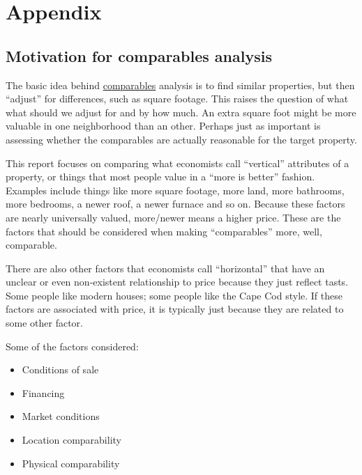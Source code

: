 \documentclass[
12pt, %
letterpaper, %
oneside, %
headinclude,footinclude, %
BCOR5mm, %
]{scrartcl}
\begin{document}
\renewcommand{\refname}{\spacedlowsmallcaps{References}} %


\pagebreak

\appendix

\section{Appendix} 

\subsection{Motivation for comparables analysis} \label{sec:methods}
The basic idea behind \href{https://en.wikipedia.org/wiki/Comparables}{comparables} analysis is to find similar properties, but then ``adjust'' for differences, such as square footage.
This raises the question of what what should we adjust for and by how much.
An extra square foot might be more valuable in one neighborhood than an other. 
Perhaps just as important is assessing whether the comparables are actually reasonable for the target property. 

This report focuses on comparing what economists call ``vertical'' attributes of a property, or things that most people value in a ``more is better'' fashion.
Examples include things like more square footage, more land, more bathrooms, more bedrooms, a newer roof, a newer furnace and so on.
Because these factors are nearly universally valued, more/newer means a higher price.
These are the factors that should be considered when making ``comparables'' more, well, comparable. 

There are also other factors that economists call ``horizontal'' that have an unclear or even non-existent relationship to price because they just reflect tasts.  
Some people like modern houses; some people like the Cape Cod style.
If these factors are associated with price, it is typically just because they are related to some other factor.

Some of the factors considered: 
\begin{itemize}
\item Conditions of sale
\item Financing
\item Market conditions
\item Location comparability
\item Physical comparability 
\end{itemize}
\end{document}
